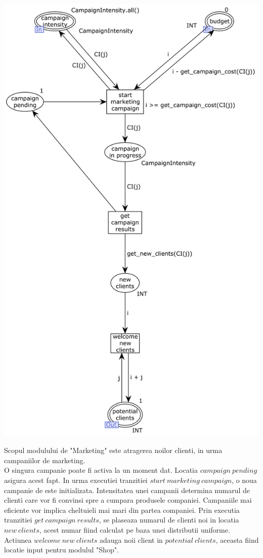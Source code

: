 \begin{spacing}{1.5}
\includegraphics[width=\textwidth]{./Parts/Chapter1/Marketing.png}

Scopul modulului de "Marketing" este atragerea noilor clienti, in urma campaniilor de marketing.\\
O singura campanie poate fi activa la un moment dat. Locatia $campaign\ pending$ asigura acest fapt.
In urma executiei tranzitiei $start\ marketing\ campaign$, o noua campanie de este initializata. Intensitatea
unei campanii determina numarul de clienti care vor fi convinsi spre a cumpara produsele companiei. Campaniile
mai eficiente vor implica cheltuieli mai mari din partea companiei.
Prin executia tranzitiei $get\ campaign\ results$, se plaseaza numarul de clienti noi in locatia $new\ clients$,
acest numar fiind calculat pe baza unei distributii uniforme. Actiunea $welcome\ new\ clients$ adauga noii
client in $potential\ clients$, aceasta fiind locatie input pentru modulul "Shop".

\end{spacing}
\newpage


